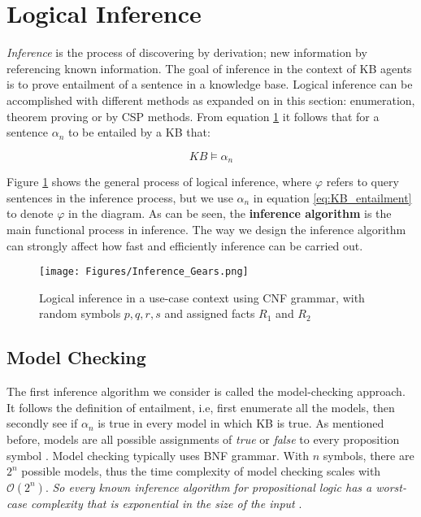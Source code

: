 


\section{Logical Inference}
\label{sec:logical_inference}
\textit{Inference} is the process of discovering by derivation; new information by referencing known information. The goal of inference in the context of KB agents is to prove entailment of a sentence in a knowledge base. Logical inference can be accomplished with different methods as expanded on in this section: enumeration, theorem proving or by CSP methods. From equation \ref{fig:entailment} it follows that for a sentence $\alpha_n$ to be entailed by a KB that:

\begin{equation}
	KB \models \alpha_n
	\label{eq:KB_entailment}
\end{equation}

Figure \ref{fig:entailment} shows the general process of logical inference, where $\varphi$ refers to query sentences in the inference process, but we use $\alpha_n$ in equation \ref{eq:KB_entailment} to denote $\varphi$ in the diagram. As can be seen, the \textbf{inference algorithm} is the main functional process in inference. The way we design the inference algorithm can strongly affect how fast and efficiently inference can be carried out. 

\begin{figure}[H]
    \centering
    \texttt{[image: Figures/Inference\_Gears.png]}
    \caption{Logical inference in a use-case context using CNF grammar, with random symbols $p,q,r,s$ and assigned facts $R_1$ and $R_2$}
    \label{fig:entailment}
\end{figure}




\subsection{Model Checking}

The first inference algorithm we consider is called the model-checking approach. It follows the definition of entailment, i.e, first enumerate all the models, then secondly see if $\alpha_n$ is true in every model in which KB is true. As mentioned before, models are all possible assignments of \textit{true} or \textit{false} to every proposition symbol \citep{russell2016artificial}. Model checking typically uses BNF grammar. With $n$ symbols, there are $2^n$ possible models, thus the time complexity of model checking scales with $\mathcal{O}(2^n)$. \textit{So every known inference algorithm for propositional logic has a worst-case complexity that is exponential in the size of the input} \citep{russell2016artificial}.\\


